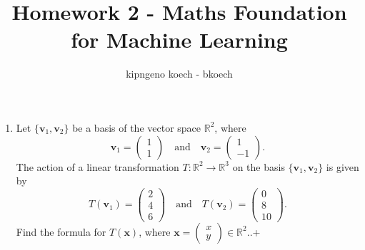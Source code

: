 \documentclass[a3paper,12pt]{extarticle} %
\begin{document}
\author{kipngeno koech - bkoech}
\title{Homework 2 - Maths Foundation for Machine Learning}   
\maketitle

\medskip

\begin{enumerate}
    \item Let \(\{ \mathbf{v}_1, \mathbf{v}_2 \}\) be a basis of the vector space \(\mathbb{R}^2\), where
    \[
    \mathbf{v}_1 = \begin{pmatrix} 1 \\ 1 \end{pmatrix} \quad \text{and} \quad \mathbf{v}_2 = \begin{pmatrix} 1 \\ -1 \end{pmatrix}.
    \]
    The action of a linear transformation \(T : \mathbb{R}^2 \to \mathbb{R}^3\) on the basis \(\{ \mathbf{v}_1, \mathbf{v}_2 \}\) is given by
    \[
    T(\mathbf{v}_1) = \begin{pmatrix} 2 \\ 4 \\ 6 \end{pmatrix} \quad \text{and} \quad T(\mathbf{v}_2) = \begin{pmatrix} 0 \\ 8 \\ 10 \end{pmatrix}.
    \]
    Find the formula for \(T(\mathbf{x})\), where \(\mathbf{x} = \begin{pmatrix} x \\ y \end{pmatrix} \in \mathbb{R}^2\)..+
    
\end{enumerate}
\end{document}
